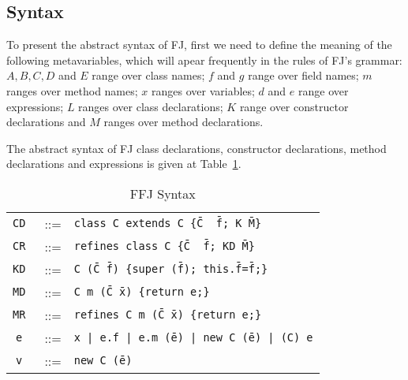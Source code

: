 
\subsection{Syntax}

To present the abstract syntax of FJ, first we need to define the meaning of the
following metavariables, which will apear frequently in the rules of FJ's
grammar: ${A, B, C, D}$ and ${E}$ range over class names; $f$
and $g$ range over field names; $m$ ranges over method names;
$x$ ranges over variables; $d$ and $e$ range over
expressions; $L$ ranges over class declarations; $K$ range over
constructor declarations and $M$ ranges over method declarations.

The abstract syntax of FJ class declarations, constructor declarations, method
declarations and expressions is given at Table~\ref{abstractsyntax}.

\begin{table}[ht!]
    \begin{tabular}{ccl}
            \texttt{CD}&~::= & \texttt{class\ C~extends~C\ \{\={C} \ \={f}; K \={M}\}}\\ 
            \texttt{CR}&~::= & \texttt{refines~class\ C\ \{\={C} \ \={f}; KD \={M}\}}\\ 
            \vspace{0.8mm}
            \texttt{KD} &~::= &
        \texttt{C~(\={C}~\={f})\
        \{super~(\={f});~this.\={f}=\={f};\}}\\
            \vspace{0.8mm}
        \texttt{MD} &~::= & \texttt{C~m~(\={C}~\={x})\ \{return~e;\}}\\
        \texttt{MR} &~::= & \texttt{refines C~m~(\={C}~\={x})\ \{return~e;\}}\\
            \vspace{0.8mm}
        \texttt{e} &~::= & \texttt{x~|~e.f~|~e.m~(\={e})~|~new~C~(\={e})~|~(C)~e} \\
        \texttt{v} &~::= & \texttt{new~C~(\={e})} \\
    \end{tabular} \\
    \vspace{1.5mm}
    \caption{\ac{FFJ} Syntax}
    \label{abstractsyntax}
\end{table}

